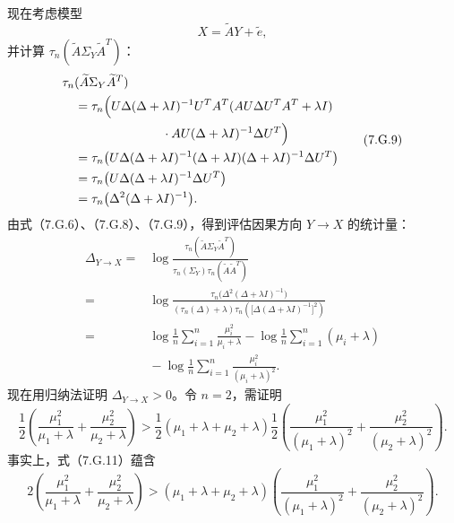现在考虑模型
\[
X=\widetilde AY+\widetilde e,
\]
并计算 $\tau_n(\widetilde A\Sigma_Y\widetilde A^T)$：
\begin{equation}
\begin{aligned}
&\tau_n(\widetilde A\Sigma_Y\widetilde A^T)\\
&\quad=\tau_n\Bigl(U\Delta(\Delta+\lambda I)^{-1}U^TA^T
 (AU\Delta U^TA^T+\lambda I)\\
&\hspace{8em}{}\cdot AU(\Delta+\lambda I)^{-1}\Delta U^T\Bigr)\\
&\quad=\tau_n\bigl(U\Delta(\Delta+\lambda I)^{-1}
 (\Delta+\lambda I)(\Delta+\lambda I)^{-1}\Delta U^T\bigr)\\
&\quad=\tau_n\bigl(U\Delta(\Delta+\lambda I)^{-1}\Delta U^T\bigr)\\
&\quad=\tau_n\bigl(\Delta^2(\Delta+\lambda I)^{-1}\bigr).
\end{aligned}\tag{7.G.9}
\end{equation}
由式（7.G.6）、（7.G.8）、（7.G.9），得到评估因果方向 $Y\to X$ 的统计量：
\begin{equation}
\begin{aligned}
\Delta_{Y\to X}
={}&\log\frac{\tau_n(\widetilde A\Sigma_Y\widetilde A^T)}
 {\tau_n(\Sigma_Y)\tau_n(\widetilde A\widetilde A^T)}\\
={}&\log\frac{\tau_n\bigl(\Delta^2(\Delta+\lambda I)^{-1}\bigr)}
 {(\tau_n(\Delta)+\lambda)\tau_n\left(\bigl[\Delta(\Delta+\lambda I)^{-1}\bigr]^2\right)}\\
={}&\log\frac1n\sum_{i=1}^n\frac{\mu_i^2}{\mu_i+\lambda}
 -\log\frac1n\sum_{i=1}^n(\mu_i+\lambda)\\
&{}-\log\frac1n\sum_{i=1}^n\frac{\mu_i^2}{(\mu_i+\lambda)^2}.
\end{aligned}\tag{7.G.10}
\end{equation}
现在用归纳法证明 $\Delta_{Y\to X}>0$。令 $n=2$，需证明
\begin{equation}
\frac12\left(\frac{\mu_1^2}{\mu_1+\lambda}+\frac{\mu_2^2}{\mu_2+\lambda}\right)
 >\frac12(\mu_1+\lambda+\mu_2+\lambda)\frac12
 \left(\frac{\mu_1^2}{(\mu_1+\lambda)^2}+\frac{\mu_2^2}{(\mu_2+\lambda)^2}\right).\tag{7.G.11}
\end{equation}
事实上，式（7.G.11）蕴含
\begin{equation}
2\left(\frac{\mu_1^2}{\mu_1+\lambda}+\frac{\mu_2^2}{\mu_2+\lambda}\right)
 >(\mu_1+\lambda+\mu_2+\lambda)
 \left(\frac{\mu_1^2}{(\mu_1+\lambda)^2}+\frac{\mu_2^2}{(\mu_2+\lambda)^2}\right).\tag{7.G.12}
\end{equation}
